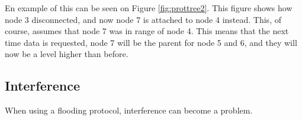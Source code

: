 En example of this can be seen on Figure \ref{fig:prottree2}. This figure shows how node 3 disconnected, and now node 7 is attached to node 4 instead. This, of course, assumes that node 7 was in range of node 4.
This means that the next time data is requested, node 7 will be the parent for node 5 and 6, and they will now be a level higher than before.

\subsection*{Interference}
When using a flooding protocol, interference can become a problem.